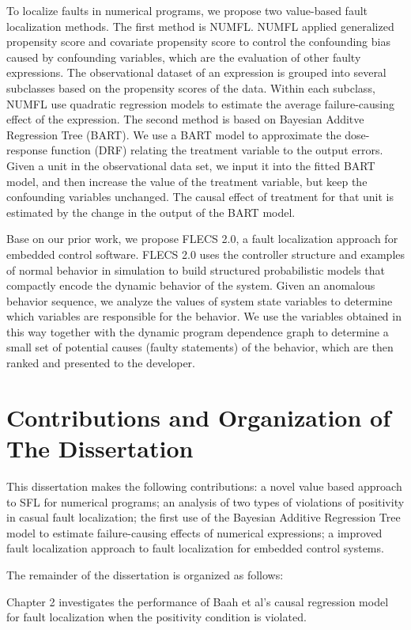 To localize faults in numerical programs, we propose two value-based fault localization methods. The first method is NUMFL. NUMFL applied generalized propensity score and covariate propensity score to control the confounding bias caused by confounding variables, which are the evaluation of other faulty expressions.  The  observational dataset of an expression is grouped into several subclasses based on the propensity scores of the data. Within each subclass, NUMFL use quadratic regression models to estimate the average failure-causing effect of the expression. The second method is based on Bayesian Additve Regression Tree (BART). We use a BART model to approximate the dose-response function (DRF) relating the treatment variable to the output errors. Given a unit in the observational data set, we input it into the fitted BART model, and then increase the value of the treatment variable, but keep the confounding variables unchanged. The causal effect of treatment for that unit is estimated by the change in the output of the BART model. 

Base on our prior work, we propose FLECS 2.0, a fault localization approach for embedded control software. FLECS 2.0 uses the controller structure and examples of normal behavior in simulation to build structured probabilistic models that compactly encode the dynamic behavior of the system. Given an anomalous behavior sequence, we analyze the values of system state variables to determine which variables are responsible for the behavior. We use the variables obtained in this way together with the dynamic program dependence graph to determine a small set of potential causes (faulty statements) of the behavior, which are then ranked and presented to the developer.

\section{Contributions and Organization of The Dissertation}
This dissertation makes the following contributions: a novel value based approach to SFL for numerical programs; an analysis of two types of violations of positivity in casual fault localization; the first use of the Bayesian Additive Regression Tree model to estimate failure-causing effects of numerical expressions;  a improved fault localization approach to fault localization for embedded control systems.

The remainder of the dissertation is organized as follows:

Chapter 2 investigates the performance of Baah et al’s causal regression model for fault localization when the positivity condition is violated.

